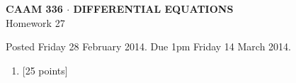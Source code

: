 \documentclass[10pt]{article}
\begin{document}
\vspace*{-5em}
\begin{center}
\large \textsf{\textbf{CAAM 336 $\cdot$ DIFFERENTIAL EQUATIONS}\\[0.5em]
Homework 27 }
\end{center}

Posted Friday 28 February 2014. Due 1pm Friday 14 March 2014.

\begin{enumerate}\addtocounter{enumi}{26}
\item {[25 points]}  
\end{enumerate}
\end{document}
